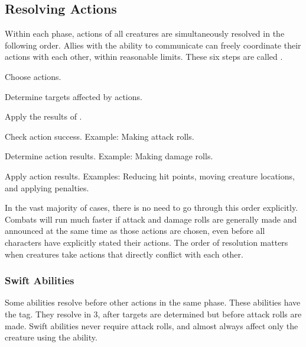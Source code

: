     \subsection{Resolving Actions}\label{Resolving Actions}

        Within each phase, actions of all creatures are simultaneously resolved in the following order.
        Allies with the ability to communicate can freely coordinate their actions with each other, within reasonable limits.
        These six steps are called .

        \begin{enumerate*}
            \item Choose actions.
            \item Determine targets affected by actions.
            \item Apply the results of .
            \item Check action success.
                Example: Making attack rolls.
            \item Determine action results.
                Example: Making damage rolls.
            \item Apply action results.
                Examples: Reducing hit points, moving creature locations, and applying penalties.
        \end{enumerate*}

        In the vast majority of cases, there is no need to go through this order explicitly.
        Combats will run much faster if attack and damage rolls are generally made and announced at the same time as those actions are chosen, even before all characters have explicitly stated their actions.
        The order of resolution matters when creatures take actions that directly conflict with each other.

        \subsubsection{Swift Abilities}\label{Swift Abilities}
            Some abilities resolve before other actions in the same phase.
            These abilities have the  tag.
            They resolve in  3, after targets are determined but before attack rolls are made.
            Swift abilities never require attack rolls, and almost always affect only the creature using the ability.

